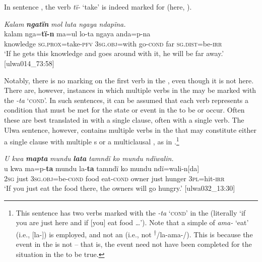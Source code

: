 In sentence , the verb \textit{tï-} ‘take’ is indeed marked for  (here, ).

\ea%
    \label{ex:syntax:252}
          \textit{Kalam} \textbf{\textit{ngatïn}} \textit{mol luta ngaya ndapïna.}\\
\gll    kalam    nga=\textbf{tï-n}        ma=ul      lo-ta    ngaya anda=p-na\\
    knowledge  \textsc{sg.prox}=take-\textsc{pfv}  3\textsc{sg.obj}=with  go-\textsc{cond}  far    \textsc{sg.dist}=be-\textsc{irr}\\
\glt `If he gets this knowledge and goes around with it, he will be far away.’ [ulwa014\_73:58]
\z

Notably, there is no  marking on the first verb in the , even though it is not  here. There are, however, instances in which multiple verbs in the  may be marked with the   \textit{-ta} ‘\textsc{cond}’. In such sentences, it can be assumed that each verb represents a condition that must be met for the state or event in the  to be or occur. Often these are best translated in  with a single clause, often with a single verb. The Ulwa sentence, however, contains multiple verbs in the  that may constitute either a single clause with multiple s or a multiclausal , as in .\footnote{This sentence has two verbs marked with the   \textit{-ta} ‘\textsc{cond}’ in the  (literally ‘if you are just here and if [you] eat food …’). Note that a simple   of \textit{ama-} ‘eat’ (i.e., [la-]) is employed, and not an    (i.e., not \textsuperscript{†}/la-ama-/). This is because the  event in the  is not  – that is, the event need not have been completed for the situation in the  to be true.}

\ea%
    \label{ex:syntax:253}
          \textit{U kwa} \textbf{\textit{mapta}} \textit{mundu} \textbf{\textit{lata}} \textit{tamndï ko mundu ndïwalin.}\\
\gll    u    kwa  ma=p-\textbf{ta}      mundu  la-\textbf{ta}    tamndï   ko mundu  ndï=wali-n[da]\\
    2\textsc{sg}   just    3\textsc{sg.obj}=be\textsc{{}-cond} food  eat\textsc{{}-cond} owner    just    hunger  3\textsc{pl}=hit-\textsc{irr}\\
\glt `If you just eat the food there, the owners will go hungry.’ [ulwa032\_13:30]
\z

